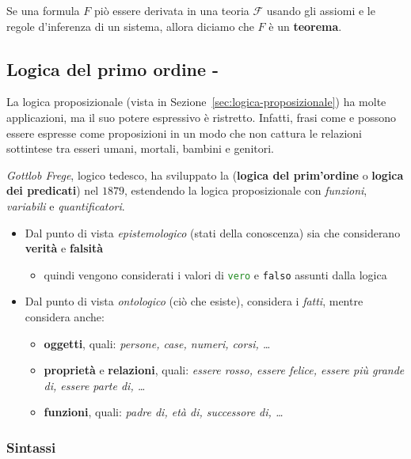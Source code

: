 \documentclass[italian, 10pt]{article}
\newcommand{\vero}{\textcolor{ForestGreen}{\texttt{vero}}\xspace} %
\newcommand{\falso}{\textcolor{BrickRed}{\texttt{falso}}\xspace} %
\begin{document}
Se una formula \(F\) piò essere derivata in una teoria \(\mathcal{F}\) usando gli assiomi e le regole d'inferenza di un sistema, allora diciamo che \(F\) è un \textbf{teorema}.

\subsection{Logica del primo ordine - \FOL}
\label{sec:logica-primo-ordine}

La logica proposizionale (vista in Sezione~\ref{sec:logica-proposizionale}) ha molte applicazioni, ma il suo potere espressivo è ristretto.
Infatti, frasi come  e  possono essere espresse come proposizioni in un modo che non cattura le relazioni sottintese tra esseri umani, mortali, bambini e genitori.

\textit{Gottlob Frege}, logico tedesco, ha sviluppato la \FOL (\textbf{logica del prim'ordine} o \textbf{logica dei predicati}) nel \(1879\), estendendo la logica proposizionale con \textit{funzioni}, \textit{variabili} e \textit{quantificatori}.

\begin{itemize}
  \item Dal punto di vista \textit{epistemologico} (stati della conoscenza) sia \PL che \FOL considerano \textbf{verità} e \textbf{falsità}
        \begin{itemize}
          \item quindi vengono considerati i valori di \vero e \falso assunti dalla logica
        \end{itemize}
  \item Dal punto di vista \textit{ontologico} (ciò che esiste), \PL considera i \textit{fatti}, mentre \FOL considera anche:
        \begin{itemize}
          \item \textbf{oggetti}, quali: \textit{persone, case, numeri, corsi, \ldots}
          \item \textbf{proprietà} e \textbf{relazioni}, quali: \textit{essere rosso, essere felice, essere più grande di, essere parte di, \ldots}
          \item \textbf{funzioni}, quali: \textit{padre di, età di, successore di, \ldots}
        \end{itemize}
\end{itemize}

\subsubsection{Sintassi}
\end{document}
